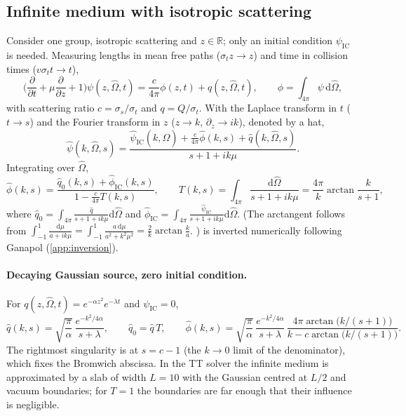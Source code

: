 \documentclass[11pt,a4paper]{article}
\numberwithin{equation}{section}
\theoremstyle{remark}
\newcommand{\Om}{\hat{\Omega}}
\newcommand{\dd}{\mathrm{d}}
\newcommand{\R}{\mathbb{R}}
\newcommand{\pderiv}[2]{\frac{\partial #1}{\partial #2}}
\begin{document}
\FloatBarrier
\subsection{Infinite medium with isotropic scattering}
\label{sec:infinite}

Consider one group, isotropic scattering and $z\in\R$; only an initial condition $\psi_{\mathrm{IC}}$ is needed. Measuring lengths in mean free paths ($\sigma_tz\to z$) and time in collision times ($v\sigma_tt\to t$),
\begin{equation}
\Big(\pderiv{}{t}+\mu\pderiv{}{z}+1\Big)\psi(z,\Om,t)=\frac{c}{4\pi}\phi(z,t)+q(z,\Om,t),
\qquad\phi=\int_{4\pi}\psi\,\dd\Om,
\end{equation}
with scattering ratio $c=\sigma_s/\sigma_t$ and $q=Q/\sigma_t$.
With the Laplace transform in $t$ ($t\to s$) and the Fourier transform in $z$ ($z\to k$, $\partial_z\to ik$), denoted by a hat,
\begin{equation}
\hat\psi(k,\Om,s)=\frac{\hat\psi_{\mathrm{IC}}(k,\Om)+\frac{c}{4\pi}\hat\phi(k,s)+\hat q(k,\Om,s)}{s+1+ik\mu}.
\end{equation}
Integrating over $\Om$,
\begin{equation}
\hat\phi(k,s)=\frac{\hat q_0(k,s)+\hat\phi_{\mathrm{IC}}(k,s)}{1-\frac{c}{4\pi}T(k,s)},\qquad
T(k,s)=\int_{4\pi}\frac{\dd\Om}{s+1+ik\mu}=\frac{4\pi}{k}\arctan\frac{k}{s+1},
\label{eq:phi-hat}
\end{equation}
where $\hat q_0=\int_{4\pi}\frac{\hat q}{s+1+ik\mu}\dd\Om$ and $\hat\phi_{\mathrm{IC}}=\int_{4\pi}\frac{\hat\psi_{\mathrm{IC}}}{s+1+ik\mu}\dd\Om$. (The arctangent follows from $\int_{-1}^1\frac{\dd\mu}{a+ik\mu}=\int_{-1}^1\frac{a\,\dd\mu}{a^2+k^2\mu^2}=\frac2k\arctan\frac ka$. \cite{TransportTheory})  is inverted numerically following Ganapol \cite{AnBenchmarks} (\cref{app:inversion}).

\paragraph{Decaying Gaussian source, zero initial condition.}
For $q(z,\Om,t)=e^{-\alpha z^2}e^{-\lambda t}$ and $\psi_{\mathrm{IC}}=0$,
\begin{equation}
\hat q(k,s)=\sqrt{\frac\pi\alpha}\,\frac{e^{-k^2/4\alpha}}{s+\lambda},\qquad \hat q_0=\hat q\,T,\qquad
\hat\phi(k,s)=\sqrt{\frac\pi\alpha}\,\frac{e^{-k^2/4\alpha}}{s+\lambda}\,\frac{4\pi\arctan\big(k/(s+1)\big)}{k-c\arctan\big(k/(s+1)\big)}.
\end{equation}
The rightmost singularity is at $s=c-1$ (the $k\to0$ limit of the denominator), which fixes the Bromwich abscissa. In the TT solver the infinite medium is approximated by a slab of width $L=10$ with the Gaussian centred at $L/2$ and vacuum boundaries; for $T=1$ the boundaries are far enough that their influence is negligible.
\end{document}
